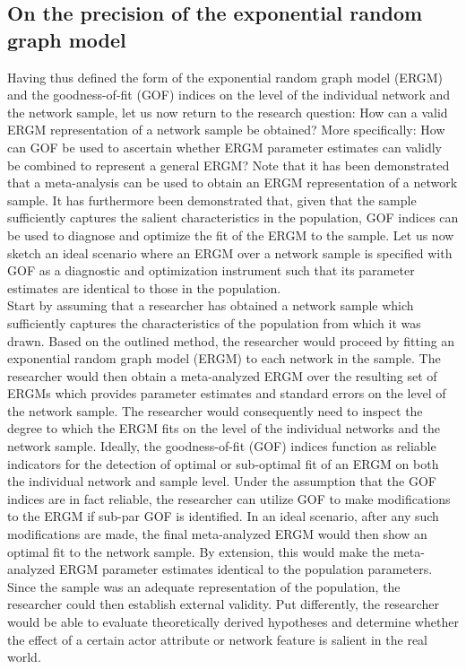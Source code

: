 \documentclass[a4paper, man]{apa6}
\begin{document}
\subsection{On the precision of the exponential random graph model}
Having thus defined the form of the exponential random graph model (ERGM) and the goodness-of-fit (GOF) indices on the level of the individual network and the network sample, let us now return to the research question: How can a valid ERGM representation of a network sample be obtained? More specifically: How can GOF be used to ascertain whether ERGM parameter estimates can validly be combined to represent a general ERGM? Note that it has been demonstrated that a meta-analysis can be used to obtain an ERGM representation of a network sample. It has furthermore been demonstrated that, given that the sample sufficiently captures the salient characteristics in the population, GOF indices can be used to diagnose and optimize the fit of the ERGM to the sample. Let us now sketch an ideal scenario where an ERGM over a network sample is specified with GOF as a diagnostic and optimization instrument such that its parameter estimates are identical to those in the population.
\\
Start by assuming that a researcher has obtained a network sample which sufficiently captures the characteristics of the population from which it was drawn. Based on the outlined method, the researcher would proceed by fitting an exponential random graph model (ERGM) to each network in the sample. The researcher would then obtain a meta-analyzed ERGM over the resulting set of ERGMs which provides parameter estimates and standard errors on the level of the network sample. The researcher would consequently need to inspect the degree to which the ERGM fits on the level of the individual networks and the network sample. Ideally, the goodness-of-fit (GOF) indices function as reliable indicators for the detection of optimal or sub-optimal fit of an ERGM on both the individual network and sample level. Under the assumption that the GOF indices are in fact reliable, the researcher can utilize GOF to make modifications to the ERGM if sub-par GOF is identified. In an ideal scenario, after any such modifications are made, the final meta-analyzed ERGM would then show an optimal fit to the network sample. By extension, this would make the meta-analyzed ERGM parameter estimates identical to the population parameters. \clearpage \noindent Since the sample was an adequate representation of the population, the researcher could then establish external validity. Put differently, the researcher would be able to evaluate theoretically derived hypotheses and determine whether the effect of a certain actor attribute or network feature is salient in the real world. 
\end{document}
